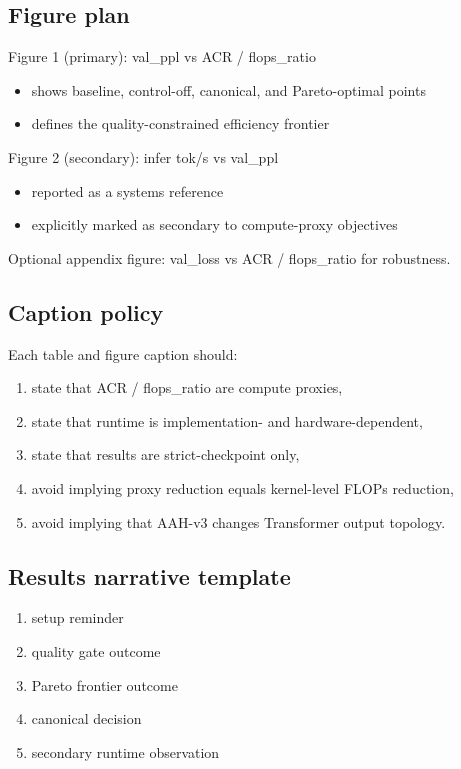 \documentclass[11pt]{article}
\begin{document}
\subsection{Figure plan}

Figure 1 (primary): val_ppl vs ACR / flops_ratio
\begin{itemize}
\item shows baseline, control-off, canonical, and Pareto-optimal points
\item defines the quality-constrained efficiency frontier
\end{itemize}

Figure 2 (secondary): infer tok/s vs val_ppl
\begin{itemize}
\item reported as a systems reference
\item explicitly marked as secondary to compute-proxy objectives
\end{itemize}

Optional appendix figure: val_loss vs ACR / flops_ratio for robustness.

\subsection{Caption policy}

Each table and figure caption should:
\begin{enumerate}
\item state that ACR / flops_ratio are compute proxies,
\item state that runtime is implementation- and hardware-dependent,
\item state that results are strict-checkpoint only,
\item avoid implying proxy reduction equals kernel-level FLOPs reduction,
\item avoid implying that AAH-v3 changes Transformer output topology.
\end{enumerate}

\subsection{Results narrative template}
\begin{enumerate}
\item setup reminder
\item quality gate outcome
\item Pareto frontier outcome
\item canonical decision
\item secondary runtime observation
\end{enumerate}
\end{document}
